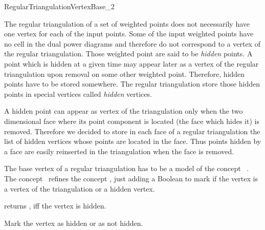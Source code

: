 

\begin{ccRefConcept}{RegularTriangulationVertexBase_2}


\ccDefinition
  
The regular triangulation of a set of weighted points does not
necessarily
have one vertex for each of the input points. Some of the input
weighted points have no cell in the dual power diagrams
and therefore do not correspond to a vertex of the regular
triangulation.
Those weighted point are said to be {\it hidden} points.
A  point which is hidden at a given time may appear later as a vertex of
the regular triangulation upon removal on some other weighted point.
Therefore, hidden points have to be stored somewhere.
The regular triangulation store those hidden points
in special vertices called {\it hidden} vertices.

A hidden point can appear as vertex of the triangulation
only when the
two dimensional face where its point component is located
(the face which hides it)
is removed. Therefore we decided to store 
in each  face of a regular triangulation
the list of hidden vertices whose points are located in the face.
Thus  points hidden by a face are easily reinserted in the triangulation
when the face is removed.

The base vertex of a regular triangulation has to be a model
of the concept \ccRefName\ .
The concept \ccRefName\ refines the concept 
 ,
just adding a Boolean to mark if the vertex is a 
vertex of the triangulation or a hidden vertex.

\ccRefines




{returns , iff the vertex is hidden.}

{Mark the vertex as hidden or as not hidden.}


\ccHasModels
{}

\ccSeeAlso
{}

\end{ccRefConcept}


